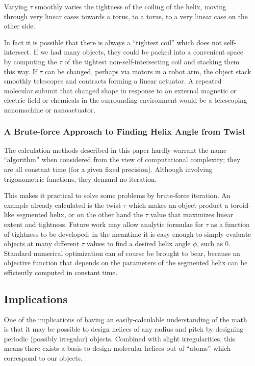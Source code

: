 \documentclass[mathematics,article,submit,pdftex,moreauthors]{Definitions/mdpi}
\begin{document}
Varying $\tau$ smoothly varies the tightness of the coiling of the helix,
moving through very linear cases towards a torus,
to a torus, to a very linear case on the other side.

In fact it is possible that there is always a ``tightest coil''
which does not self-intersect. If we had many objects,
they could be packed into a convenient space by computing the $\tau$
of the tightest non-self-intersecting coil and stacking them this way.
If $\tau$ can be changed, perhaps via motors in a robot arm,
the object stack smoothly telescopes and contracts forming a
linear actuator.
A repeated molecular subunit that changed shape in
response to an external magnetic or electric field or chemicals in the surrounding
environment would be a telescoping nanomachine or nanoactuator.


\subsubsection{A Brute-force Approach to Finding Helix Angle from Twist}

The calculation methods described in this paper hardly warrant the name ``algorithm'' when considered from the view of computational complexity;
they are all constant time (for a given fixed precision).
Although involving trigonometric functions, they demand no iteration.

This makes it practical to solve some problems by brute-force iteration.
An example already calculated is the twist $\tau$ which makes
an object product a toroid-like segmented helix, or on the other hand
the $\tau$ value that maximizes linear extent and tightness.
Future work may allow analytic formulae for $\tau$ as a function of
tightness to be developed; in the meantime it is easy enough
to simply evaluate objects at many different $\tau$ values to find a
desired helix angle $\phi$, such as $0$.
Standard numerical optimization can of course be brought to bear, because an objective function
that depends on the parameters of the segmented helix can
be efficiently computed in constant time.

\subsection{Implications}

One of the implications of having an easily-calculable understanding of the math
is that it may be possible to design helices
of any radius and pitch by designing periodic (possibly irregular) objects.
Combined with slight
irregularities, this means there exists a basis to design molecular helices
out of ``atoms'' which correspond to our objects.
\end{document}
